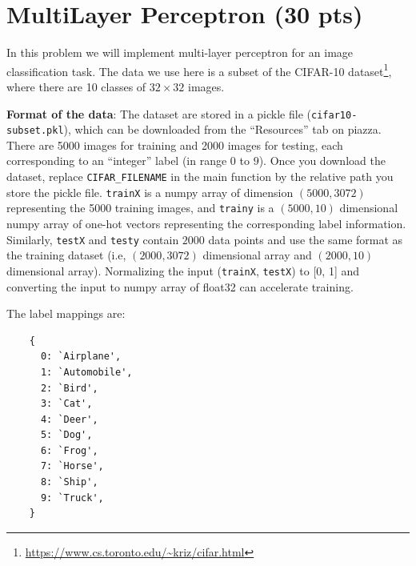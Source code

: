 \section{MultiLayer Perceptron (30 pts)}

In this problem we will implement multi-layer perceptron for an image classification task. The data we use here is a subset of the CIFAR-10 dataset\footnote{\url{https://www.cs.toronto.edu/~kriz/cifar.html}}, where there are 10 classes of $32\times32$ images.


{\bf Format of the data}: 
The dataset are stored in a pickle file (\texttt{cifar10-subset.pkl}), which can be downloaded from the ``Resources'' tab on piazza. There are 5000 images for training and 2000 images for testing, each corresponding to an ``integer'' label (in range $0$ to $9$). Once you download the dataset, replace \texttt{CIFAR\_FILENAME} in the main function by the relative path you store the pickle file. \texttt{trainX} is a numpy array of dimension $(5000, 3072)$ representing the 5000 training images, and \texttt{trainy} is a $(5000, 10)$ dimensional numpy array of one-hot vectors representing the corresponding label information. Similarly, \texttt{testX} and \texttt{testy} contain $2000$ data points and use the same format as the training dataset (i.e, $(2000, 3072)$ dimensional array and $(2000, 10)$ dimensional array). Normalizing the input (\texttt{trainX}, \texttt{testX}) to [0, 1] and converting the input to numpy array of float32 can accelerate training.

The label mappings are:
\begin{verbatim}
    { 
      0: `Airplane', 
      1: `Automobile',
      2: `Bird',
      3: `Cat',
      4: `Deer',
      5: `Dog',
      6: `Frog',
      7: `Horse',
      8: `Ship',
      9: `Truck',
    }
\end{verbatim}

